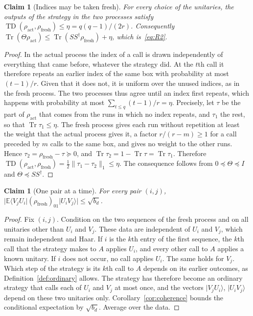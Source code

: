 \documentclass[11pt,letterpaper]{article}
\newtheorem{claim}[theorem]{Claim}
\theoremstyle{definition}\newtheorem{definition}[theorem]{Definition}
\newcommand{\E}{\mathbb E}
\newcommand{\Tr}{\operatorname{Tr}}
\newcommand{\TD}{\operatorname{TD}}
\newcommand{\ket}[1]{\lvert#1\rangle}
\newcommand{\bra}[1]{\langle#1\rvert}
\newcommand{\norm}[1]{\lVert#1\rVert}
\begin{document}
\begin{claim}[Indices may be taken fresh]\label{clm:fresh}
For every choice of the unitaries, the outputs of the strategy in the
two processes satisfy
$\TD(\rho_{\mathrm{act}},\rho_{\mathrm{fresh}})\le\eta=q(q-1)/(2r)$.
Consequently $\Tr(\Theta\rho_{\mathrm{act}})
\le\Tr(SS^\dagger\rho_{\mathrm{fresh}})+\eta$, which
is~\eqref{eq:R2}.
\end{claim}

\begin{proof}
In the actual process the index of a call is drawn independently of
everything that came before, whatever the strategy did. At the $t$th
call it therefore repeats an earlier index of the same box with
probability at most $(t-1)/r$. Given that it does not, it is uniform
over the unused indices, as in the fresh process. The two processes
thus agree until an index first repeats, which happens with probability
at most $\sum_{t\le q}(t-1)/r=\eta$. Precisely, let $\tau$ be the part
of $\rho_{\mathrm{act}}$ that comes from the runs in which no index
repeats, and $\tau_1$ the rest, so that $\Tr\tau_1\le\eta$. The fresh
process gives each run without repetition at least the weight that the
actual process gives it, a factor $r/(r-m)\ge1$ for a call preceded by
$m$ calls to the same box, and gives no weight to the other runs. Hence
$\tau_2=\rho_{\mathrm{fresh}}-\tau\succeq0$, and
$\Tr\tau_2=1-\Tr\tau=\Tr\tau_1$. Therefore
$\TD(\rho_{\mathrm{act}},\rho_{\mathrm{fresh}})
=\frac12\norm{\tau_1-\tau_2}_1\le\eta$. The consequence follows from
$0\preceq\Theta\preceq I$ and $\Theta\preceq SS^\dagger$.
\end{proof}

\begin{claim}[One pair at a time]\label{clm:pair}
For every pair $(i,j)$,
$\bigl|\E\bra{V_jU_i}(\rho_{\mathrm{fresh}})_{01}\ket{U_iV_j}\bigr|\le\sqrt{b_d}$.
\end{claim}

\begin{proof}
Fix $(i,j)$. Condition on the two sequences of the fresh process and
on all unitaries other than $U_i$ and $V_j$. These data are independent
of $U_i$ and $V_j$, which remain independent and Haar. If $i$ is the
$k$th entry of the first sequence, the $k$th call that the strategy
makes to $A$ applies $U_i$, and every other call to $A$ applies a known
unitary. If $i$ does not occur, no call applies $U_i$. The same holds
for $V_j$. Which step of the strategy is its $k$th call to $A$ depends
on its earlier outcomes, as Definition~\ref{def:ordinary} allows. The
strategy has therefore become an ordinary strategy that calls each of
$U_i$ and $V_j$ at most once, and the vectors $\ket{V_jU_i}$,
$\ket{U_iV_j}$ depend on these two unitaries only. Corollary~\ref{cor:coherence} bounds the conditional
expectation by $\sqrt{b_d}$. Average over the data.
\end{proof}
\end{document}
